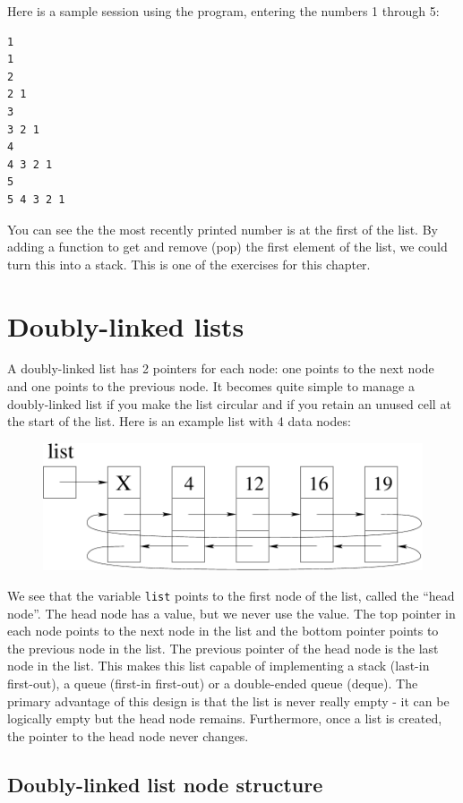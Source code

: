 \documentclass[11pt,b5paper]{book}
\begin{document}
Here is a sample session using the program, entering the numbers 1 through 5:

\begin{verbatim}
1
1 
2
2 1 
3
3 2 1 
4
4 3 2 1 
5
5 4 3 2 1 
\end{verbatim}

You can see the the most recently printed number is at the first of the list.
By adding a function to get and remove (pop) the first element of the list, we could turn this
into a stack.
This is one of the exercises for this chapter.


\section{Doubly-linked lists}

A doubly-linked list has 2 pointers for each node: one points to the next node and one points to the previous node.
It becomes quite simple to manage a doubly-linked list if you make the list circular and if you retain an unused
cell at the start of the list.
Here is an example list with 4 data nodes:

\begin{figure}[h!]
\centering\includegraphics[width=4.5in]{doubly_linked_list.pdf}
\end{figure}

We see that the variable {\tt list} points to the first node of the list, called the ``head node''.
The head node has a value, but we never use the value.
The top pointer in each node points to the next node in the list and the bottom pointer points to the previous node
in the list.
The previous pointer of the head node is the last node in the list.
This makes this list capable of implementing a stack (last-in first-out), a queue (first-in first-out) or a double-ended queue
(deque).
The primary advantage of this design is that the list is never really empty - it can be logically empty but the head node
remains.
Furthermore, once a list is created, the pointer to the head node never changes.

\subsection{Doubly-linked list node structure}
\end{document}
